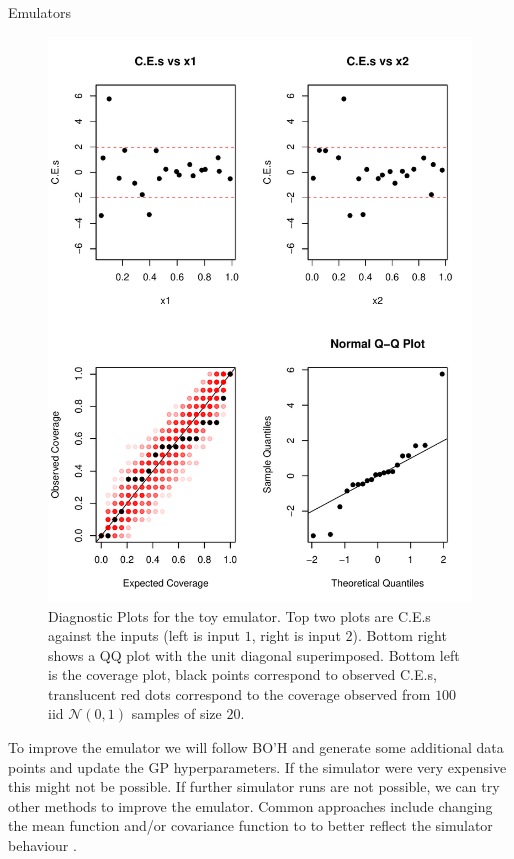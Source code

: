 \begin{chapter}{Emulators \label{Ch:Emulators}}
\begin{figure}[h]
   \includegraphics{fig-emulators/diags.pdf}
   \caption{Diagnostic Plots for the toy emulator. Top two plots are C.E.s against the inputs (left is input $1$, right is input $2$). Bottom right shows a QQ plot with the unit diagonal superimposed. Bottom left is the coverage plot, black points correspond to observed C.E.s, translucent red dots correspond to the coverage observed from $100$ iid $\mathcal{N}(0,1)$ samples of size $20$.}
   \label{Fig:diags}
 \end{figure}
To improve the emulator we will follow BO'H and generate some additional data points and update the GP hyperparameters. If the simulator were very expensive this might not be possible. If further simulator runs are not possible, we can try other methods to improve the emulator. Common approaches include changing the mean function \citep{Overstall2016} and/or covariance function to to better reflect the simulator behaviour \citep{Volodina2020,Vernon2022tense}.

\end{chapter}
